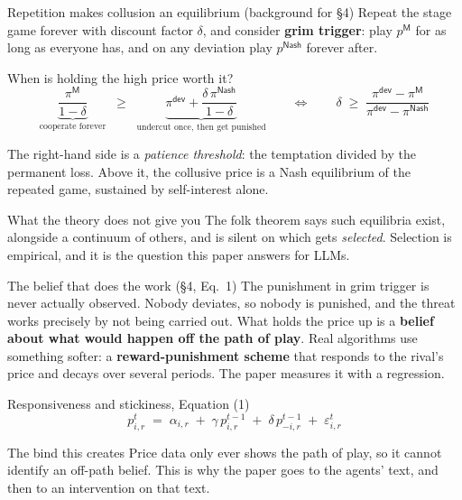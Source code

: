 \documentclass[aspectratio=169,9pt]{beamer}
\newcommand{\orange}[1]{\textcolor{AmazonOrange}{\textbf{#1}}}
\newcommand{\blue}[1]{\textcolor{densityblue}{\textbf{#1}}}
\newcommand{\muted}[1]{\textcolor{EPICMuted}{#1}}
\begin{document}
\begin{frame}{Repetition makes collusion an equilibrium \muted{(background for \S4)}}
Repeat the stage game forever with discount factor $\delta$, and consider \orange{grim trigger}: play
$p^{\mathsf{M}}$ for as long as everyone has, and on any deviation play $p^{\mathsf{Nash}}$ forever after.
\begin{block}{When is holding the high price worth it?}
\[
\underbrace{\frac{\pi^{\mathsf{M}}}{1-\delta}}_{\text{cooperate forever}}
\;\;\ge\;\;
\underbrace{\pi^{\mathsf{dev}} + \frac{\delta\,\pi^{\mathsf{Nash}}}{1-\delta}}_{\text{undercut once, then get punished}}
\qquad\Longleftrightarrow\qquad
\delta \;\ge\; \frac{\pi^{\mathsf{dev}} - \pi^{\mathsf{M}}}{\pi^{\mathsf{dev}} - \pi^{\mathsf{Nash}}}
\]
\end{block}
\pause
The right-hand side is a \textit{patience threshold}: the temptation divided by the permanent loss. Above it,
the collusive price is a Nash equilibrium of the repeated game, sustained by self-interest alone.
\vspace{0.15cm}
\pause
\begin{alertblock}{What the theory does not give you}
The folk theorem says such equilibria exist, alongside a continuum of others, and is silent on which gets
\textit{selected}. Selection is empirical, and it is the question this paper answers for LLMs.
\end{alertblock}
\end{frame}

\begin{frame}{The belief that does the work \muted{(\S4, Eq.~1)}}
The punishment in grim trigger is never actually observed. Nobody deviates, so nobody is punished, and the
threat works precisely by not being carried out. What holds the price up is a \blue{belief about what would
happen off the path of play}.
\vspace{0.15cm}
\pause
Real algorithms use something softer: a \orange{reward-punishment scheme} that responds to the rival's price
and decays over several periods. The paper measures it with a regression.
\begin{block}{Responsiveness and stickiness, Equation (1)}
\[
p^{t}_{i,r} \;=\; \alpha_{i,r} \;+\; \gamma\,p^{t-1}_{i,r} \;+\; \delta\,p^{t-1}_{-i,r} \;+\; \varepsilon^{t}_{i,r}
\]
\end{block}
\pause
\begin{alertblock}{The bind this creates}
Price data only ever shows the path of play, so it cannot identify an off-path belief. This is why the paper
goes to the agents' text, and then to an intervention on that text.
\end{alertblock}
\end{frame}
\end{document}
